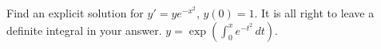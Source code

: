 {Find an explicit solution for $y' = ye^{-x^2}$, $y(0)=1$.  It is all right to
leave a definite integral in your answer.}
{$y = \exp\left(\int_0^x e^{-t^2}\,dt\right)$.}